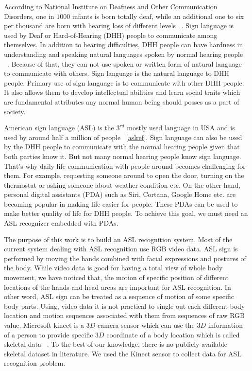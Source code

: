 \documentclass[10pt,twocolumn,letterpaper]{article}
\begin{document}
According to National Institute on Deafness and Other Communication Disorders, one in $1000$ infants is born totally deaf, while an additional one to six per thousand are born with hearing loss of different levels ~\cite{3072291}. Sign language is used by Deaf or Hard-of-Hearing (DHH) people to communicate among themselves. In addition to hearing difficulties, DHH people can have hardness in understanding and speaking natural languages spoken by normal hearing people ~\cite{doi:10.1080/01690965.2012.705006}. Because of that, they can not use spoken or written form of natural language to communicate with others. Sign language is the natural language to DHH people. Primary use of sign language is to communicate with other DHH people. It also allows them to develop intellectual abilities and learn social traits which are fundamental attributes any normal human being should posses as a part of society.

American sign language (ASL) is the $3^{rd}$ mostly used language in USA and is used by around half a million of people ~\ref{aslref}. Sign language can also be used by the DHH people to communicate with the normal hearing people given that both parties know it. But not many normal hearing people know sign language. That's why daily life communication with people around becomes challenging for them. For example, requesting someone around to open the door, turning on the thermostat or asking someone about weather condition etc. On the other hand, personal digital assistants (PDA) such as Siri, Cortana, Google Home etc. are becoming popular in making life easier for people. These PDAs can be used to make better quality of life for DHH people. To achieve this goal, we must need an ASL recognizer embedded with PDAs.

The purpose of this work is to build an ASL recognition system. Most of the current  system dealing with ASL recognition use RGB video data. ASL sign is performed by moving the hands combined with facial expressions and postures of the body. While video data is good for having a total view of whole body movement, we have noticed that, the motion of specific position of different locations of the hands and head areas are important for ASL recognition. In other word, ASL sign can be treated as a sequence of motion of some specific body parts. Using, video data it is not practical to single out each different body location and motion sequences associated with them from sequences of raw RGB value. Microsoft kinect is a $3D$ camera sensor which can use the $3D$ information of a person to provide specific $3D$ coordinate of a body location which is called skeletal data ~\cite{Zhang:2012:MKS:2225053.2225203}. To the best of our knowledge, there is no publicly available skeletal dataset in literature. We used the Kinect sensor to collect data for ASL recognition problem. 
\end{document}
